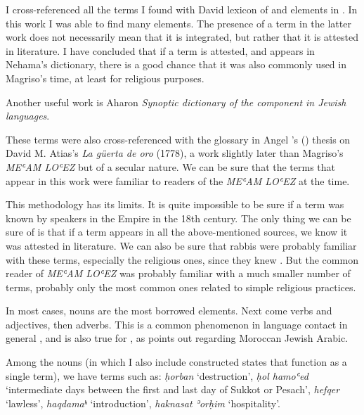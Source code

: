 \documentclass[output=paper,colorlinks,citecolor=brown,babel,arabicfont]{langscibook}
\begin{document}
I cross-referenced all the terms I found with David  lexicon of  and  elements in . In this work I was able to find many elements. The presence of a term in the latter work does not necessarily mean that it is integrated, but rather that it is attested in  literature. I have concluded that if a term is attested, and appears in Nehama's dictionary, there is a good chance that it was also commonly used in Magriso's time, at least for religious purposes.  

Another useful work is Aharon  \textit{Synoptic dictionary of the  component in Jewish languages}. 

These terms were also cross-referenced with the glossary in Angel \citeauthor{berenguer_amador2016}'s (\citeyear{berenguer_amador2016}) thesis on David M. Atias's \textit{La güerta de oro} (1778), a work slightly later than Magriso's \textit{MEʿAM LOʿEZ} but of a secular nature. We can be sure that the terms that appear in this work were familiar to readers of the \textit{MEʿAM LOʿEZ} at the time. 

This methodology has its limits. It is quite impossible to be sure if a  term was known by  speakers in the  Empire in the 18th century. The only thing we can be sure of is that if a term appears in all the above-mentioned sources, we know it was attested in  literature. We can also be sure that rabbis were probably familiar with these terms, especially the religious ones, since they knew . But the common reader of \textit{MEʿAM LOʿEZ} was probably familiar with a much smaller number of  terms, probably only the most common ones related to simple religious practices. 

In most cases, nouns are the most borrowed elements. Next come verbs and adjectives, then adverbs. This is a common phenomenon in language contact in general \citep[77]{sankoff_poplack_vanniarajan1990}, and is also true for , as \citet[178--180]{bar-asher1978} points out regarding Moroccan Jewish Arabic.

Among the nouns (in which I also include constructed states that function as a single term), we have terms such as: \textit{ḥorban} `destruction', \textit{ḥol hamoʿed} `intermediate days between the first and last day of Sukkot or Pesach', \textit{hefqer} `lawless', \textit{haqdamaʰ} `introduction', \textit{haknasat ʾorḥim} `hospitality'.  
\end{document}
